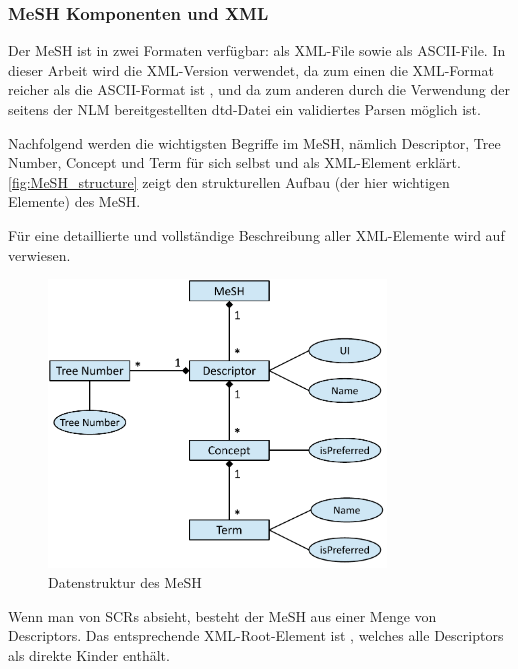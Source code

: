 \subsubsection{MeSH Komponenten und XML}
\label{sec:xml_struktur}
Der MeSH ist in zwei Formaten verfügbar: als XML-File sowie als ASCII-File. In dieser Arbeit wird die XML-Version verwendet, da zum einen die XML-Format reicher als die ASCII-Format ist \cite{Nelson2004}, und da zum anderen durch die Verwendung der seitens der NLM bereitgestellten dtd-Datei ein validiertes Parsen möglich ist. 

Nachfolgend werden die wichtigsten Begriffe im MeSH, nämlich Descriptor, Tree Number, Concept und Term für sich selbst und als XML-Element erklärt. \autoref{fig:MeSH_structure} zeigt den strukturellen Aufbau (der hier wichtigen Elemente) des MeSH. \par

Für eine detaillierte und vollständige Beschreibung aller XML-Elemente wird auf \cite{MeSHXML2012} verwiesen.\par

\begin{figure}[h]
\begin{center}
\includegraphics[width=0.8\textwidth]{figs/MeSH_structure_neu.pdf}
\end{center}
\caption{Datenstruktur des MeSH}
\label{fig:MeSH_structure}
\end{figure}

Wenn man von SCRs absieht, besteht der MeSH aus einer Menge von Descriptors. Das entsprechende XML-Root-Element ist , welches alle Descriptors als direkte Kinder enthält.

